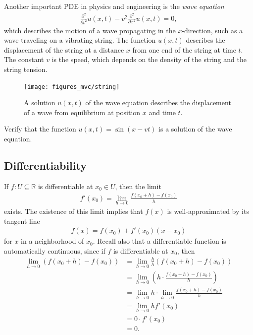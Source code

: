 \documentclass[12pt,letterpaper,reqno]{article}
\numberwithin{equation}{section}
\newcommand{\R}{\ensuremath{\mathbb R}}
\begin{document}
{Another important PDE in physics and engineering is the \emph{wave equation}
\begin{align*}
	\frac{\partial^2}{\partial t^2}u(x,t)-v^2\frac{\partial^2}{\partial x^2}u(x,t)=0,
\end{align*}
which describes the motion of a wave propagating in the $x$-direction, such as a wave traveling on a vibrating string. The function $u(x,t)$ describes the displacement of the string at a distance $x$ from one end of the string at time $t$. The constant $v$ is the speed, which depends on the density of the string and the string tension.

\begin{figure}[h]
	\begin{center}
		\texttt{[image: figures\_mvc/string]}
	\end{center}
\caption{A solution $u(x,t)$ of the wave equation describes the displacement of a wave from equilibrium at position $x$ and time $t$.}
\end{figure}

\begin{exercise}
Verify that the function $u(x,t)=\sin(x-vt)$ is a solution of the wave equation.	
\end{exercise}



\subsection{Differentiability}
If $f:U \subseteq \R$ is differentiable at $x_0 \in U$, then the limit
\begin{align}\label{eq:old_derivative}
	f'(x_0)=\lim_{h \to 0}\frac{f(x_0+h)-f(x_0)}{h}
\end{align}
exists. The existence of this limit implies that $f(x)$ is well-approximated by its tangent line
\begin{align*}
	f(x)=f(x_0)+f'(x_0)(x-x_0)
\end{align*}
for $x$ in a neighborhood of $x_0$. Recall also that a differentiable function is automatically continuous, since if $f$ is differentiable at $x_0$, then 
\begin{align*}
	\lim_{h \to 0}(f(x_0+h)-f(x_0))&=\lim_{h \to 0}\frac{h}{h}(f(x_0+h)-f(x_0)) \\
	&=\lim_{h \to 0}\left(h \cdot \frac{f(x_0+h)-f(x_0)}{h}\right) \\
	&=\lim_{h \to 0}h \cdot \lim_{h \to 0}\frac{f(x_0+h)-f(x_0)}{h} \\
	&=\lim_{h \to 0}h f'(x_0) \\
	&=0 \cdot f'(x_0) \\
	&=0.
\end{align*}

}
\end{document}
